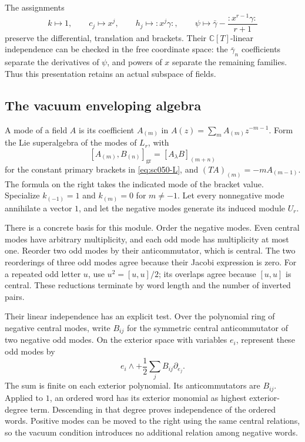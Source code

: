 The assignments
\begin{equation}\label{eq:sc050-Lmap}
 k\longmapsto1,\qquad c_j\longmapsto x^j,\qquad
 h_j\longmapsto:x^j\gamma:,\qquad
 \psi\longmapsto\bar\gamma-\frac{:x^{r-1}\gamma:}{r+1}
\end{equation}
preserve the differential, translation and brackets. Their
\(\mathbb C[T]\)-linear independence can be checked in the free
coordinate space: the \(\bar\gamma_n\) coefficients separate the
derivatives of \(\psi\), and powers of \(x\) separate the remaining
families. Thus this presentation retains an actual subspace of fields.

\subsection{The vacuum enveloping algebra}

A mode of a field \(A\) is its coefficient \(A_{(m)}\) in
\(A(z)=\sum_m A_{(m)}z^{-m-1}\).
Form the Lie superalgebra of the modes of \(L_r\), with
\[
 [A_{(m)},B_{(n)}]_{\mathrm{gr}}=[A_\lambda B]_{(m+n)}
\]
for the constant primary brackets in \eqref{eq:sc050-L}, and
\((TA)_{(m)}=-mA_{(m-1)}\).
The formula on the right takes the indicated mode of the bracket
value. Specialize \(k_{(-1)}=1\) and \(k_{(m)}=0\) for \(m\ne-1\).
Let every nonnegative mode annihilate a vector \(1\), and let the
negative modes generate its induced module \(U_r\).

There is a concrete basis for this module. Order the negative modes.
Even central modes have arbitrary multiplicity, and each odd mode has
multiplicity at most one. Reorder two odd modes by their
anticommutator, which is central. The two reorderings of three odd
modes agree because their Jacobi expression is zero. For a repeated
odd letter \(u\), use \(u^2=[u,u]/2\); its overlaps agree because
\([u,u]\) is central. These reductions terminate by word length and
the number of inverted pairs.

Their linear independence has an explicit test. Over the polynomial
ring of negative central modes, write \(B_{ij}\) for the symmetric
central anticommutator of two negative odd modes. On the exterior
space with variables \(e_i\), represent these odd modes by
\[
 e_i\wedge+\frac12\sum_j B_{ij}\partial_{e_j}.
\]
The sum is finite on each exterior polynomial. Its anticommutators
are \(B_{ij}\). Applied to \(1\), an ordered word has its exterior
monomial as highest exterior-degree term. Descending in that degree
proves independence of the ordered words. Positive modes can be
moved to the right using the same central relations, so the vacuum
condition introduces no additional relation among negative words.

